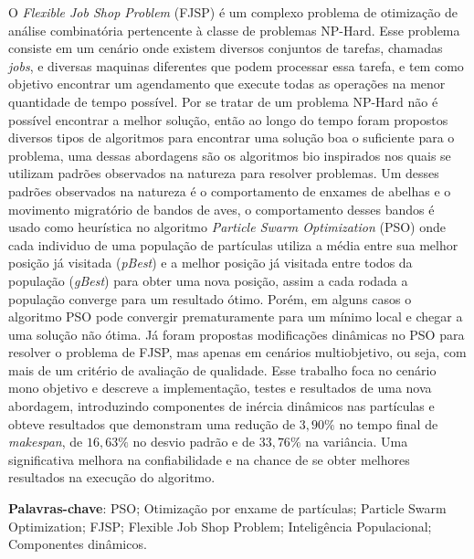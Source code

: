 \par

\begin{resumo}
    O \textit{Flexible Job Shop Problem} (FJSP) é um complexo problema de otimização de análise combinatória pertencente à classe de problemas NP-Hard. Esse problema consiste em um cenário onde existem diversos conjuntos de tarefas, chamadas \textit{jobs}, e diversas maquinas diferentes que podem processar essa tarefa, e tem como objetivo encontrar um agendamento que execute todas as operações na menor quantidade de tempo possível. Por se tratar de um problema NP-Hard não é possível encontrar a melhor solução, então ao longo do tempo foram propostos diversos tipos de algoritmos para encontrar uma solução boa o suficiente para o problema, uma dessas abordagens são os algoritmos bio inspirados nos quais se utilizam padrões observados na natureza para resolver problemas. Um desses padrões observados na natureza é o comportamento de enxames de abelhas e o movimento migratório de bandos de aves, o comportamento desses bandos é usado como heurística no algoritmo \textit{Particle Swarm Optimization} (PSO) onde cada individuo de uma população de partículas utiliza a média entre sua melhor posição já visitada (\textit{pBest}) e a melhor posição já visitada entre todos da população (\textit{gBest}) para obter uma nova posição, assim a cada rodada a população converge para um resultado ótimo. Porém, em alguns casos o algoritmo PSO pode convergir prematuramente para um mínimo local e chegar a uma solução não ótima. Já foram propostas modificações dinâmicas no PSO para resolver o problema de FJSP, mas apenas em cenários multiobjetivo, ou seja, com mais de um critério de avaliação de qualidade. Esse trabalho foca no cenário mono objetivo e descreve a implementação, testes e resultados de uma nova abordagem, introduzindo componentes de inércia dinâmicos nas partículas e obteve resultados que demonstram uma redução de $3,90\%$ no tempo final de \textit{makespan}, de $16,63\%$ no desvio padrão e de $33,76\%$ na variância. Uma significativa melhora na confiabilidade e na chance de se obter melhores resultados na execução do algoritmo.\vspace{\onelineskip}

\noindent\textbf{Palavras-chave}: PSO; Otimização por enxame de partículas; Particle Swarm Optimization; FJSP; Flexible Job Shop Problem; Inteligência Populacional; Componentes dinâmicos.
\end{resumo}
